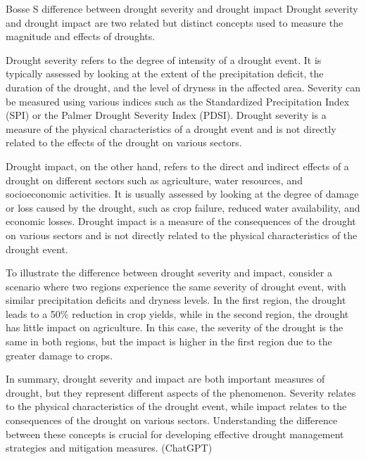 {Bosse S
difference between drought severity and drought impact
Drought severity and drought impact are two related but distinct concepts used to measure the magnitude and effects of droughts.

Drought severity refers to the degree of intensity of a drought event. It is typically assessed by looking at the extent of the precipitation deficit, the duration of the drought, and the level of dryness in the affected area. Severity can be measured using various indices such as the Standardized Precipitation Index (SPI) or the Palmer Drought Severity Index (PDSI). Drought severity is a measure of the physical characteristics of a drought event and is not directly related to the effects of the drought on various sectors.

Drought impact, on the other hand, refers to the direct and indirect effects of a drought on different sectors such as agriculture, water resources, and socioeconomic activities. It is usually assessed by looking at the degree of damage or loss caused by the drought, such as crop failure, reduced water availability, and economic losses. Drought impact is a measure of the consequences of the drought on various sectors and is not directly related to the physical characteristics of the drought event.

To illustrate the difference between drought severity and impact, consider a scenario where two regions experience the same severity of drought event, with similar precipitation deficits and dryness levels. In the first region, the drought leads to a 50\% reduction in crop yields, while in the second region, the drought has little impact on agriculture. In this case, the severity of the drought is the same in both regions, but the impact is higher in the first region due to the greater damage to crops.

In summary, drought severity and impact are both important measures of drought, but they represent different aspects of the phenomenon. Severity relates to the physical characteristics of the drought event, while impact relates to the consequences of the drought on various sectors. Understanding the difference between these concepts is crucial for developing effective drought management strategies and mitigation measures. (ChatGPT)




}
